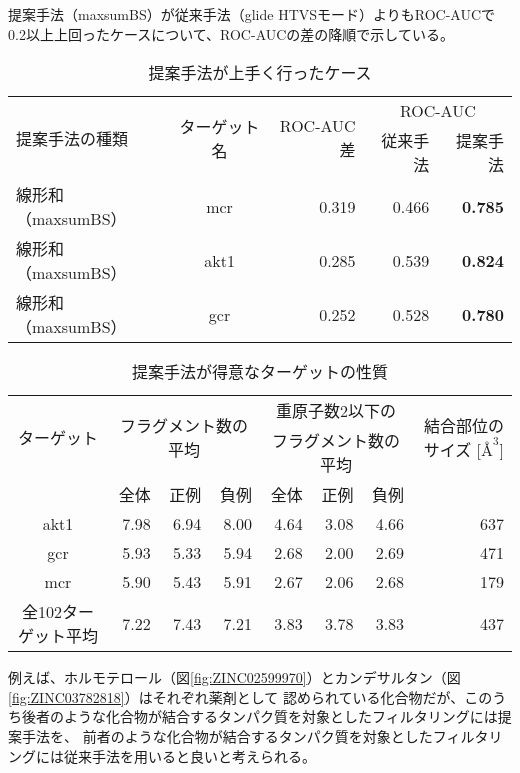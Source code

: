 \begin{table}[hb] \centering
	\caption{提案手法が上手く行ったケース}
	\label{table:target_accuracy_good}
	提案手法（maxsumBS）が従来手法（glide HTVSモード）よりもROC-AUCで\\
	0.2以上上回ったケースについて、ROC-AUCの差の降順で示している。
	\begin{tabular}{lc|r|rr}
	\hline
	\multirow{2}{*}{提案手法の種類}	&\multirow{2}{*}{ターゲット名}	&\multirow{2}{*}{ROC-AUC差}	&\multicolumn{2}{c}{ROC-AUC}	\\
								&						&							&従来手法	&提案手法		\\ \hline
	線形和（maxsumBS）			&mcr					&0.319						&0.466		&{\bf 0.785}		\\
	線形和（maxsumBS）			&akt1					&0.285						&0.539		&{\bf 0.824}		\\
	線形和（maxsumBS）			&gcr						&0.252						&0.528		&{\bf 0.780}		\\ \hline
	\end{tabular}
\end{table}
\begin{table}[htb] \centering
	\caption{提案手法が得意なターゲットの性質}
	\label{table:good_property}
	\begin{tabular}{c|rrrrrrr}
	\hline
	\multirow{2}{*}{ターゲット}	&\multicolumn{3}{c}{\multirow{2}{*}{フラグメント数の平均}}	&\multicolumn{3}{c}{重原子数2以下の}		&\multirow{2}{*}{結合部位のサイズ [$Å^3$]}	\\
							&		&		&								&\multicolumn{3}{c}{フラグメント数の平均}	&										\\
							&全体	&正例	&負例							&全体	&正例		&負例			&										\\ \hline
	akt1						&7.98	&6.94	&8.00							&4.64	&3.08		&4.66			&637									\\
	gcr						&5.93	&5.33	&5.94							&2.68	&2.00		&2.69			&471									\\
	mcr						&5.90	&5.43	&5.91							&2.67	&2.06		&2.68			&179									\\ \hline
	全102ターゲット平均		&7.22	&7.43	&7.21							&3.83	&3.78		&3.83			&437									\\ \hline
	\end{tabular}
\end{table}

\newpage

例えば、ホルモテロール（図\ref{fig:ZINC02599970}）とカンデサルタン（図\ref{fig:ZINC03782818}）はそれぞれ薬剤として
認められている化合物だが、このうち後者のような化合物が結合するタンパク質を対象としたフィルタリングには提案手法を、
前者のような化合物が結合するタンパク質を対象としたフィルタリングには従来手法を用いると良いと考えられる。

